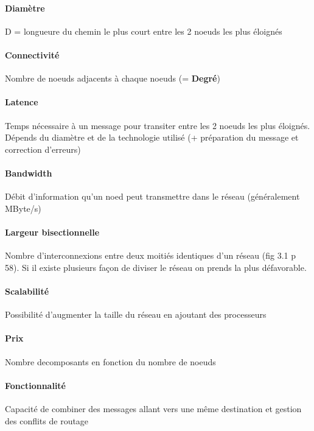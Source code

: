 \documentclass[12pt,a4paper,oneside, titlepage]{article}
\begin{document}
      \paragraph{Diamètre} D = longueure du chemin le plus court entre les 2 noeuds les plus éloignés

      \paragraph{Connectivité} Nombre de noeuds adjacents à chaque noeuds (= \textbf{Degré})

      \paragraph{Latence} Temps nécessaire à un message pour transiter entre les 2 noeuds les plus éloignés.
      Dépends du diamètre et de la technologie utilisé (+ préparation du message et correction d'erreurs)

      \paragraph{Bandwidth} Débit d'information qu'un noed peut transmettre dans le réseau (généralement MByte/s)

      \paragraph{Largeur bisectionnelle} Nombre d'interconnexions entre deux moitiés identiques d'un réseau (fig 3.1 p 58).
      Si il existe plusieurs façon de diviser le réseau on prends la plus défavorable.

      \paragraph{Scalabilité} Possibilité d’augmenter la taille du réseau en ajoutant des processeurs

      \paragraph{Prix} Nombre decomposants en fonction du nombre de noeuds

      \paragraph{Fonctionnalité}  Capacité de combiner des messages allant vers une même destination et gestion des conflits de routage
\end{document}
